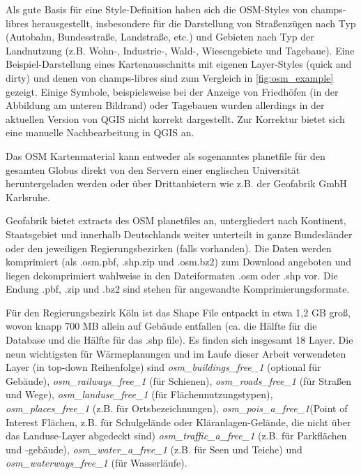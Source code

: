 			Als gute Basis für eine Style-Definition haben sich die OSM-Styles von champs-libres herausgestellt, insbesondere für die Darstellung von Straßenzügen nach Typ (Autobahn, Bundesstraße, Landstraße, etc.) und Gebieten nach Typ der Landnutzung (z.B. Wohn-, Industrie-, Wald-, Wiesengebiete und Tagebaue). Eine Beispiel-Darstellung eines Kartenausschnitts mit eigenen Layer-Styles (quick and dirty) und denen von champs-libres sind zum Vergleich in \autoref{fig:osm_example} gezeigt. Einige Symbole, beispielsweise bei der Anzeige von Friedhöfen (in der Abbildung am unteren Bildrand) oder Tagebauen wurden allerdings in der aktuellen Version von QGIS nicht korrekt dargestellt. Zur Korrektur bietet sich eine manuelle Nachbearbeitung in QGIS an. \cite{web_gitlab_champs_libres}

			Das OSM Kartenmaterial kann entweder als sogenanntes planetfile für den gesamten Globus direkt von den Servern einer englischen Universität heruntergeladen werden oder über Drittanbietern wie z.B. der Geofabrik GmbH Karlsruhe. \cite{web_osm_de}\cite{web_geofabrik}

			Geofabrik bietet extracts des OSM planetfiles an, untergliedert nach Kontinent, Staatsgebiet und innerhalb Deutschlands weiter unterteilt in ganze Bundesländer oder den jeweiligen Regierungsbezirken (falls vorhanden). Die Daten werden komprimiert (als .osm.pbf, .shp.zip und .osm.bz2) zum Download angeboten und liegen dekomprimiert wahlweise in den Dateiformaten .osm oder .shp vor. Die Endung .pbf, .zip und .bz2 sind stehen für angewandte Komprimierungsformate. \cite{web_geofabrik}
			
			Für den Regierungsbezirk Köln ist das Shape File entpackt in etwa 1,2 GB groß, wovon knapp 700 MB allein auf Gebäude entfallen (ca. die Hälfte für die Database und die Hälfte für das .shp file). Es finden sich insgesamt 18 Layer. Die neun wichtigsten für Wärmeplanungen und im Laufe dieser Arbeit verwendeten Layer (in top-down Reihenfolge) sind \textit{osm\_buildings\_free\_1} (optional für Gebäude), \textit{osm\_railways\_free\_1} (für Schienen), \textit{osm\_roads\_free\_1} (für Straßen und Wege), \textit{osm\_landuse\_free\_1} (für Flächennutzungstypen), \textit{osm\_places\_free\_1} (z.B. für Ortsbezeichnungen), \textit{osm\_pois\_a\_free\_1}(Point of Interest Flächen, z.B. für Schulgelände oder Kläranlagen-Gelände, die nicht über das Landuse-Layer abgedeckt sind) \textit{osm\_traffic\_a\_free\_1} (z.B. für Parkflächen und -gebäude), \textit{osm\_water\_a\_free\_1} (z.B. für Seen und Teiche) und \textit{osm\_waterways\_free\_1} (für Wasserläufe). 
			
